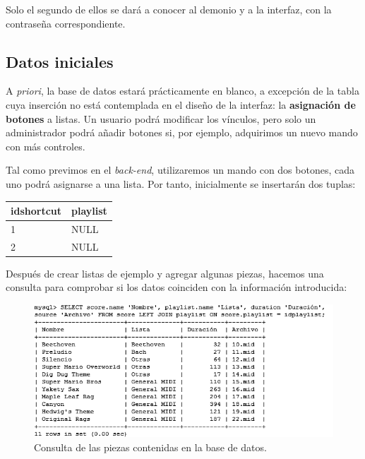 \smallskip

Solo el segundo de ellos se dará a conocer al demonio y a la interfaz, con la contraseña correspondiente.

\subsection{Datos iniciales}

A \textit{priori}, la base de datos estará prácticamente en blanco, a excepción de la tabla cuya inserción no está contemplada en el diseño de la interfaz: la \textbf{asignación de botones} a listas. Un usuario podrá modificar los vínculos, pero solo un administrador podrá añadir botones si, por ejemplo, adquirimos un nuevo mando con más controles.

Tal como previmos en el \textit{back-end}, utilizaremos un mando con dos botones, cada uno podrá asignarse a una lista. Por tanto, inicialmente se insertarán dos tuplas:

\smallskip

\begin{center}
	\begin{tabular}{|l|l|}
		\hline \textbf{idshortcut} & \textbf{playlist} \\ 
		\hline 1 & NULL \\
		\hline 2 & NULL \\ 
		\hline 
	\end{tabular}
	\smallskip
\end{center}

\smallskip

Después de crear listas de ejemplo y agregar algunas piezas, hacemos una consulta para comprobar si los datos coinciden con la información introducida:

\smallskip

\begin{figure}[H]
	\noindent \begin{centering}
		\includegraphics[width=\linewidth*3/4]{capitulo5/cap_sql}
		\par\end{centering}
	\smallskip
	\caption{\label{fig:cap_sql} Consulta de las piezas contenidas en la base de datos.}
\end{figure} 

